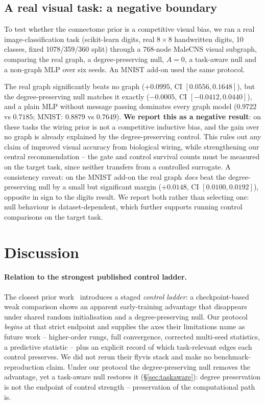 \documentclass[10pt,twocolumn,letterpaper]{article}
\begin{document}
\subsection{A real visual task: a negative boundary}
\label{sec:visualtask}

To test whether the connectome prior is a competitive visual bias, we ran a
real image-classification task (scikit-learn digits, real $8\times8$
handwritten digits, 10 classes, fixed 1078/359/360 split) through a 768-node
MaleCNS visual subgraph, comparing the real graph, a degree-preserving null,
$A\!=\!0$, a task-aware null and a non-graph MLP over six seeds. An MNIST
add-on used the same protocol.

The real graph significantly beats no graph ($+0.0995$, CI
$[0.0556,0.1648]$), but the degree-preserving null matches it exactly
($-0.0005$, CI $[-0.0412,0.0440]$), and a plain MLP without message passing
dominates every graph model ($0.9722$ vs $0.7185$; MNIST: $0.8879$ vs
$0.7649$). \textbf{We report this as a negative result}: on these tasks the
wiring prior is not a competitive inductive bias, and the gain over no graph
is already explained by the degree-preserving control. This rules out any
claim of improved visual accuracy from biological wiring, while strengthening
our central recommendation -- the gate and control survival counts must be
measured on the target task, since neither transfers from a controlled
surrogate. A consistency caveat: on the MNIST add-on the real graph \emph{does}
beat the degree-preserving null by a small but significant margin
($+0.0148$, CI $[0.0100,0.0192]$), opposite in sign to the digits result. We
report both rather than selecting one: null behaviour is dataset-dependent,
which further supports running control comparisons on the target task.

\section{Discussion}
\label{sec:discussion}

\paragraph{Relation to the strongest published control ladder.}
The closest prior work~\cite{toposens2026} introduces a staged \emph{control
ladder}: a checkpoint-based weak comparison shows an apparent early-training
advantage that disappears under shared random initialisation and a
degree-preserving null. Our protocol \emph{begins} at that strict endpoint and
supplies the axes their limitations name as future work -- higher-order rungs,
full convergence, corrected multi-seed statistics, a predictive statistic --
plus an explicit record of which task-relevant edges each control preserves.
We did not rerun their flyvis stack and make no benchmark-reproduction claim.
Under our protocol the degree-preserving null removes the advantage, yet a
task-aware null restores it (\S\ref{sec:taskaware}): degree preservation is not
the endpoint of control strength -- preservation of the computational path is.
\end{document}
